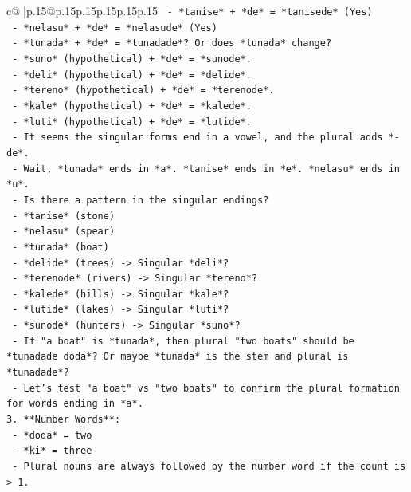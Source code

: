 \documentclass{article}
\begin{document}
{\begin{supertabular}{c@{$\;$}|p{.15\linewidth}@{}p{.15\linewidth}p{.15\linewidth}p{.15\linewidth}p{.15\linewidth}p{.15\linewidth}}
{{{\texttt{        {-} *tanise* + *de* = *tanisede* (Yes)} \\
\texttt{        {-} *nelasu* + *de* = *nelasude* (Yes)} \\
\texttt{        {-} *tunada* + *de* = *tunadade*? Or does *tunada* change?} \\
\texttt{        {-} *suno* (hypothetical) + *de* = *sunode*.} \\
\texttt{        {-} *deli* (hypothetical) + *de* = *delide*.} \\
\texttt{        {-} *tereno* (hypothetical) + *de* = *terenode*.} \\
\texttt{        {-} *kale* (hypothetical) + *de* = *kalede*.} \\
\texttt{        {-} *luti* (hypothetical) + *de* = *lutide*.} \\
\texttt{      {-} It seems the singular forms end in a vowel, and the plural adds *{-}de*.} \\
\texttt{      {-} Wait, *tunada* ends in *a*. *tanise* ends in *e*. *nelasu* ends in *u*.} \\
\texttt{      {-} Is there a pattern in the singular endings?} \\
\texttt{        {-} *tanise* (stone)} \\
\texttt{        {-} *nelasu* (spear)} \\
\texttt{        {-} *tunada* (boat)} \\
\texttt{        {-} *delide* (trees) {-}> Singular *deli*?} \\
\texttt{        {-} *terenode* (rivers) {-}> Singular *tereno*?} \\
\texttt{        {-} *kalede* (hills) {-}> Singular *kale*?} \\
\texttt{        {-} *lutide* (lakes) {-}> Singular *luti*?} \\
\texttt{        {-} *sunode* (hunters) {-}> Singular *suno*?} \\
\texttt{      {-} If "a boat" is *tunada*, then plural "two boats" should be *tunadade doda*? Or maybe *tunada* is the stem and plural is *tunadade*?} \\
\texttt{      {-} Let's test "a boat" vs "two boats" to confirm the plural formation for words ending in *a*.} \\
\texttt{3.  **Number Words**:} \\
\texttt{    {-} *doda* = two} \\
\texttt{    {-} *ki* = three} \\
\texttt{    {-} Plural nouns are always followed by the number word if the count is > 1.} \\
}}}
\end{supertabular}}
\end{document}
